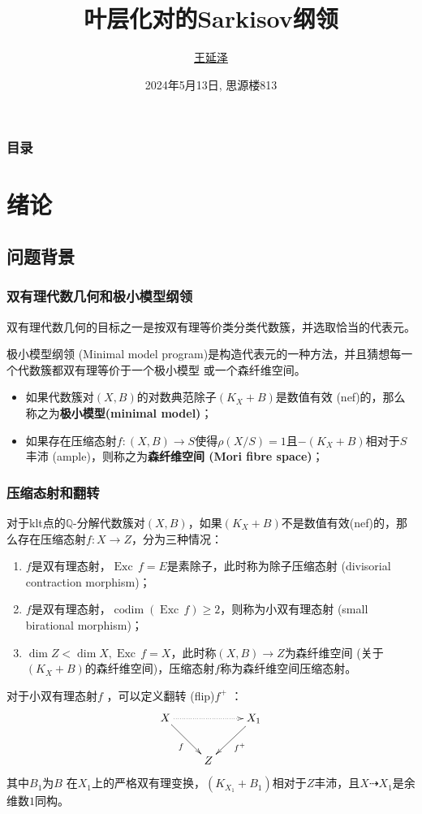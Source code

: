 \documentclass[10pt]{ctexbeamer}
\title[title]{叶层化对的Sarkisov纲领}
\author[Yanze Wang]{\href{mailto:wyz2016zxc@outlook.com}{王延泽}}
\institute[AMSS, CAS]{中国科学院数学与系统科学研究院}
\date{2024年5月13日, 思源楼813}
\begin{document}
\begin{frame}[plain]
  \maketitle
\end{frame}

\begin{frame}[t]
  \frametitle{目录}
  \tableofcontents
\end{frame}

\section{绪论}\label{sec:1}
\subsection{问题背景}\label{subsec:1-1}
\begin{frame}[shrink]
  \frametitle{双有理代数几何和极小模型纲领}
  双有理代数几何的目标之一是按双有理等价类分类代数簇，并选取恰当的代表元。

  \pause
  极小模型纲领 (Minimal model program)是构造代表元的一种方法，并且猜想每一个代数簇都双有理等价于一个极小模型 或一个森纤维空间。
  \begin{itemize}
    \pause
    \item 如果代数簇对$(X,B)$的对数典范除子$(K_{X}+B)$是数值有效 (nef)的，那么称之为\textbf{极小模型(minimal model)}；
    
    \pause
    \item 如果存在压缩态射$f:(X,B)\to S$使得$\rho(X/S)=1$且$-(K_{X}+B)$相对于$S$ 丰沛 (ample)，则称之为\textbf{森纤维空间 (Mori fibre space)}；
  \end{itemize}
\end{frame}

\begin{frame}[shrink]
  \frametitle{压缩态射和翻转}
对于klt点的$\mathbb{Q}$-分解代数簇对$(X,B)$，如果$(K_{X}+B)$不是数值有效(nef)的，那么存在压缩态射$f:X\to Z$，分为三种情况：
\begin{enumerate}
    \pause
  \item $f$是双有理态射，$\operatorname{Exc}\,f=E$是素除子，此时称为除子压缩态射 (divisorial contraction morphism)；
    \pause
  \item $f$是双有理态射，$\operatorname{codim }(\operatorname{Exc}\,f) \geqslant 2$，则称为小双有理态射 (small birational morphism)；
    \pause
  \item $\dim Z < \dim X, \operatorname{Exc}\,f=X$，此时称$(X,B)\to Z$为森纤维空间 (关于$ (K_{X}+B) $的森纤维空间)，压缩态射$f$称为森纤维空间压缩态射。
\end{enumerate}
    \pause
对于小双有理态射$f$ ，可以定义翻转 (flip)$f^{+}$ ：
    \[ \xymatrix{
        X\ar[rd]_{f} \ar@{.>}[rr] & & X_{1}\ar[ld]^{f^{+}} \\
      & Z & } \]
      其中$B_{1}$为$B$ 在$X_{1}$上的严格双有理变换，$(K_{X_{1}}+B_{1})$相对于$Z$丰沛，且$X \dashrightarrow X_{1}$是余维数$1$同构。
\end{frame}
\end{document}
